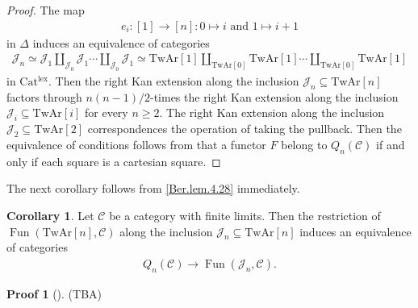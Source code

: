 \documentclass[a4paper,dvipdfmx,11pt,reqno]{amsart}
\DeclareMathOperator{\Fun}{Fun}
\newcommand{\C}{\mathcal{C}}
\newcommand{\J}{\mathcal{J}}
\newcommand{\Catlex}{\mathrm{Cat^{lex}}}
\newcommand{\TwAr}{\mathrm{TwAr}}
\theoremstyle{definition}
\newtheorem{corollary}[theorem]{Corollary}
\newtheorem{newproof}[theorem]{Proof}
\begin{document}
\begin{proof}
  The map 
  \begin{align*}
    e_i : [1] \to [n] : 0 \mapsto i \text{ and } 1 \mapsto i+1
  \end{align*}
  in $\Delta$ induces an equivalence of categories 
  \begin{align*}
    \J_n 
    \simeq \J_1 \coprod_{\J_0} \J_1 \cdots \coprod_{\J_0} \J_1 
    \simeq \TwAr[1] \coprod_{\TwAr[0]} \TwAr[1] \cdots \coprod_{\TwAr[0]} \TwAr[1]
  \end{align*}
  in $\Catlex$.
  Then the right Kan extension along the inclusion $\J_n \subseteq \TwAr[n]$ factors through $n(n-1)/2$-times the right Kan extension along the inclusion $\J_i \subseteq \TwAr[i]$ for every $n \geq 2$.
  The right Kan extension along the inclusion $\J_2 \subseteq \TwAr[2]$ correspondences the operation of taking the pullback.
  Then the equivalence of conditions follows from that a functor $F$ belong to $Q_n(\C)$ if and only if each square is a cartesian square.
\end{proof}

The next corollary follows from \cref{Ber.lem.4.28} immediately.

\begin{corollary} \label{Ber.cor.4.31}
  Let $\C$ be a category with finite limits.
  Then the restriction of $\Fun(\TwAr[n],\C)$ along the inclusion $\J_n \subseteq \TwAr[n]$ induces an equivalence of categories
  \begin{align*}
    Q_n(\C) \to \Fun(\J_n,\C).
  \end{align*}
\end{corollary}

\begin{newproof}[] \label{proof_of_HLS23.prop.3.2}
  (TBA)
\end{newproof}

\printbibliography
\end{document}
